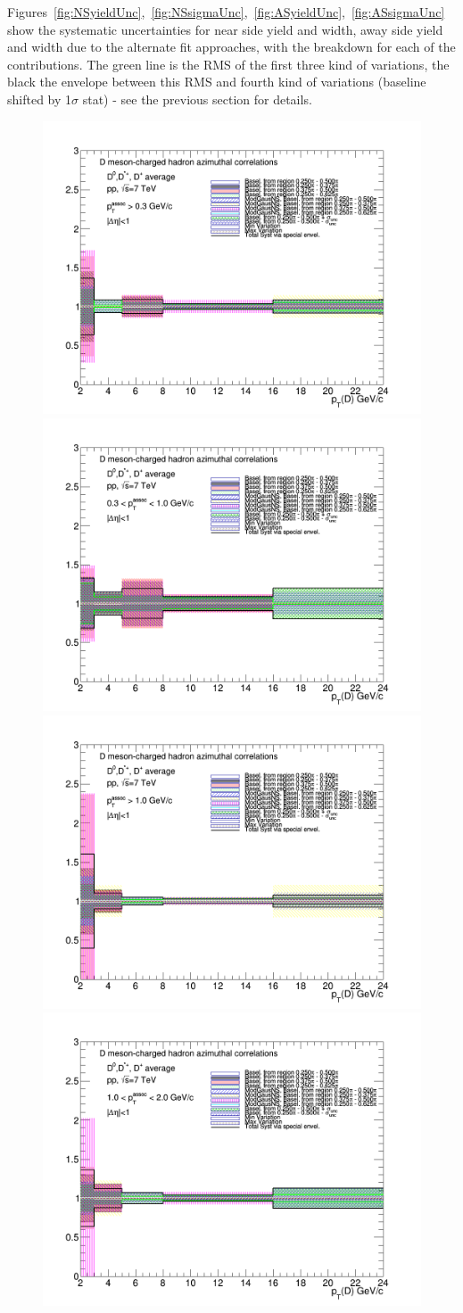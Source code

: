 \clearpage

Figures~\ref{fig:NSyieldUnc},~\ref{fig:NSsigmaUnc},~\ref{fig:ASyieldUnc},~\ref{fig:ASsigmaUnc} show the systematic uncertainties for near side yield and width, away side yield and width due to the alternate fit approaches, with the breakdown for each of the contributions. The green line is the RMS of the first three kind of variations, the black the envelope between this RMS and fourth kind of variations (baseline shifted by 1$\sigma$ stat) - see the previous section for details.

\begin{figure}[!htbp]
\centering
{\includegraphics[width=0.48\linewidth, height=0.33\linewidth]{figures/FitOutput/BaselineSystematicSourcesNSYield_pthad03to99.png}}
{\includegraphics[width=0.48\linewidth, height=0.33\linewidth]{figures/FitOutput/BaselineSystematicSourcesNSYield_pthad03to1.png}}
{\includegraphics[width=0.48\linewidth, height=0.33\linewidth]{figures/FitOutput/BaselineSystematicSourcesNSYield_pthad1to99.png}}
{\includegraphics[width=0.48\linewidth, height=0.33\linewidth]{figures/FitOutput/BaselineSystematicSourcesNSYield_pthad1to2.png}}

\end{figure}
